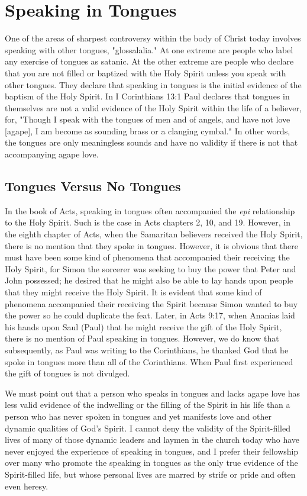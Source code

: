 \chapter{Speaking in Tongues}

One of the areas of sharpest controversy within the body of Christ today involves speaking with other tongues, "glossalalia." At one extreme are people who label any exercise of tongues as satanic. At the other extreme are people who declare that you are not filled or baptized with the Holy Spirit unless you speak with other tongues. They declare that speaking in tongues is the initial evidence of the baptism of the Holy Spirit. In I Corinthians 13:1 Paul declares that tongues in themselves are not a valid evidence of the Holy Spirit within the life of a believer, for, "Though I speak with the tongues of men and of angels, and have not love [agape], I am become as sounding brass or a clanging cymbal." In other words, the tongues are only meaningless sounds and have no validity if there is not that accompanying agape love. 

\section*{Tongues Versus No Tongues}

In the book of Acts, speaking in tongues often accompanied the \emph{epi} relationship to the Holy Spirit. Such is the case in Acts chapters 2, 10, and 19. However, in the eighth chapter of Acts, when the Samaritan believers received the Holy Spirit, there is no mention that they spoke in tongues. However, it is obvious that there must have been some kind of phenomena that accompanied their receiving the Holy Spirit, for Simon the sorcerer was seeking to buy the power that Peter and John possessed; he desired that he might also be able to lay hands upon people that they might receive the Holy Spirit. It is evident that some kind of phenomena accompanied their receiving the Spirit because Simon wanted to buy the power so he could duplicate the feat. Later, in Acts 9:17, when Ananias laid his hands upon Saul (Paul) that he might receive the gift of the Holy Spirit, there is no mention of Paul speaking in tongues. However, we do know that subsequently, as Paul was writing to the Corinthians, he thanked God that he spoke in tongues more than all of the Corinthians. When Paul first experienced the gift of tongues is not divulged. 

We must point out that a person who speaks in tongues and lacks agape love has less valid evidence of the indwelling or the filling of the Spirit in his life than a person who has never spoken in tongues and yet manifests love and other dynamic qualities of God's Spirit. I cannot deny the validity of the Spirit-filled lives of many of those dynamic leaders and laymen in the church today who have never enjoyed the experience of speaking in tongues, and I prefer their fellowship over many who promote the speaking in tongues as the only true evidence of the Spirit-filled life, but whose personal lives are marred by strife or pride and often even heresy. 

